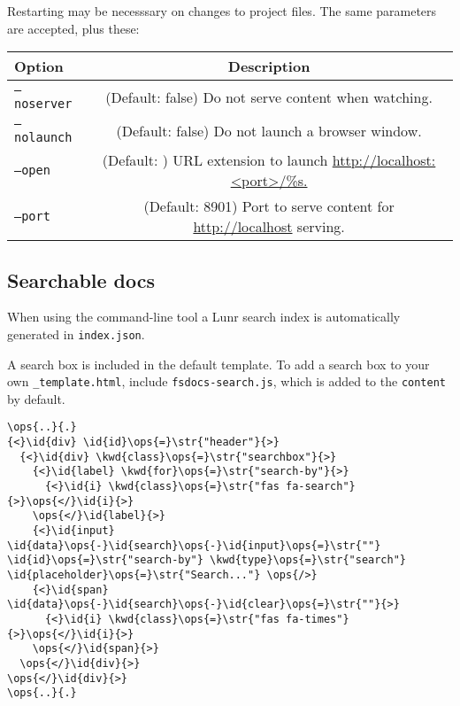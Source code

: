 \documentclass{article}
\newcommand{\id}[1]{\textcolor{black}{#1}}
\newcommand{\kwd}[1]{\textcolor{navy}{#1}}
\newcommand{\ops}[1]{\textcolor{purple}{#1}}
\newcommand{\str}[1]{\textcolor{olive}{#1}}
\begin{document}
Restarting may be necesssary on changes to project files. The same parameters are accepted, plus these:
\begin{tabular}{|l|c|}\hline
\textbf{Option} & \textbf{Description}\\ \hline\hline
\texttt{--noserver} & (Default: false) Do not serve content when watching.\\ \hline
\texttt{--nolaunch} & (Default: false) Do not launch a browser window.\\ \hline
\texttt{--open} & (Default: ) URL extension to launch \href{http://localhost:<port>/\%s.}{http://localhost:<port>/\%s.}\\ \hline
\texttt{--port} & (Default: 8901) Port to serve content for \href{http://localhost}{http://localhost} serving.\\ \hline
\end{tabular}

\subsection*{Searchable docs}



When using the command-line tool a Lunr search index is automatically generated in \texttt{index.json}.


A search box is included in the default template.  To add a search box
to your own \texttt{\_template.html}, include \texttt{fsdocs-search.js}, which is added to the \texttt{content}
by default.
\begin{Verbatim}[commandchars=\\\{\}]
\ops{..}{.}
{<}\id{div} \id{id}\ops{=}\str{"header"}{>}
  {<}\id{div} \kwd{class}\ops{=}\str{"searchbox"}{>}
    {<}\id{label} \kwd{for}\ops{=}\str{"search-by"}{>}
      {<}\id{i} \kwd{class}\ops{=}\str{"fas fa-search"}{>}\ops{</}\id{i}{>}
    \ops{</}\id{label}{>}
    {<}\id{input} \id{data}\ops{-}\id{search}\ops{-}\id{input}\ops{=}\str{""} \id{id}\ops{=}\str{"search-by"} \kwd{type}\ops{=}\str{"search"} \id{placeholder}\ops{=}\str{"Search..."} \ops{/>}
    {<}\id{span} \id{data}\ops{-}\id{search}\ops{-}\id{clear}\ops{=}\str{""}{>}
      {<}\id{i} \kwd{class}\ops{=}\str{"fas fa-times"}{>}\ops{</}\id{i}{>}
    \ops{</}\id{span}{>}
  \ops{</}\id{div}{>}
\ops{</}\id{div}{>}
\ops{..}{.}

\end{Verbatim}
\end{document}
